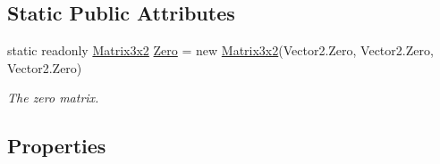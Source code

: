 \subsection*{Static Public Attributes}
\begin{DoxyCompactItemize}
\item 
static readonly \hyperlink{struct_open_t_k_1_1_matrix3x2}{Matrix3x2} \hyperlink{struct_open_t_k_1_1_matrix3x2_a48892050acebbb8e3b2213cdab1cdc9f}{Zero} = new \hyperlink{struct_open_t_k_1_1_matrix3x2}{Matrix3x2}(Vector2.\-Zero, Vector2.\-Zero, Vector2.\-Zero)
\begin{DoxyCompactList}\small\item\em The zero matrix. \end{DoxyCompactList}\end{DoxyCompactItemize}
\subsection*{Properties}
